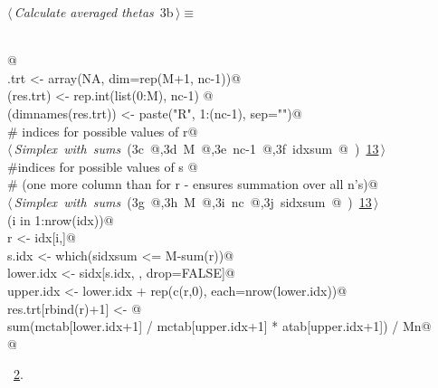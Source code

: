 \documentclass[reqno]{amsart}
\renewcommand{\NWtarget}[2]{\hypertarget{#1}{#2}}
\renewcommand{\NWlink}[2]{\hyperlink{#1}{#2}}
\begin{document}
\begin{flushleft} \small\label{scrap4}\raggedright\small
\NWtarget{nuweb3b}{} $\langle\,${\itshape Calculate averaged thetas}\nobreak\ {\footnotesize {3b}}$\,\rangle\equiv$
\vspace{-1ex}
\begin{list}{}{} \item
\mbox{}\verb@@\\
\mbox{}\verb@    @\\
\mbox{}\verb@res.trt <- array(NA, dim=rep(M+1, nc-1))@\\
\mbox{}\verb@dimnames(res.trt) <- rep.int(list(0:M), nc-1) @\\
\mbox{}\verb@names(dimnames(res.trt)) <- paste("R", 1:(nc-1), sep="")@\\
\mbox{}\verb@# indices for possible values of r@\\
\mbox{}\verb@@\hbox{$\langle\,${\itshape Simplex with sums}\nobreak\ ({\footnotesize 3c\label{scrap5}
 }\mbox{}\verb@idx @,{\footnotesize 3d\label{scrap6}
 }\mbox{}\verb@ M @,{\footnotesize 3e\label{scrap7}
 }\mbox{}\verb@ nc-1 @,{\footnotesize 3f\label{scrap8}
 }\mbox{}\verb@ idxsum @ ) {\footnotesize \NWlink{nuweb13}{13}}$\,\rangle$}\verb@@\\
\mbox{}\verb@#indices for possible values of s @\\
\mbox{}\verb@# (one more column than for r - ensures summation over all n's)@\\
\mbox{}\verb@@\hbox{$\langle\,${\itshape Simplex with sums}\nobreak\ ({\footnotesize 3g\label{scrap9}
 }\mbox{}\verb@sidx @,{\footnotesize 3h\label{scrap10}
 }\mbox{}\verb@ M @,{\footnotesize 3i\label{scrap11}
 }\mbox{}\verb@ nc @,{\footnotesize 3j\label{scrap12}
 }\mbox{}\verb@ sidxsum @ ) {\footnotesize \NWlink{nuweb13}{13}}$\,\rangle$}\verb@@\\
\mbox{}\verb@for (i in 1:nrow(idx)){@\\
\mbox{}\verb@  r <- idx[i,]@\\
\mbox{}\verb@  s.idx <- which(sidxsum <= M-sum(r))@\\
\mbox{}\verb@  lower.idx <- sidx[s.idx, , drop=FALSE]@\\
\mbox{}\verb@  upper.idx <- lower.idx + rep(c(r,0), each=nrow(lower.idx))@\\
\mbox{}\verb@  res.trt[rbind(r)+1] <- @\\
\mbox{}\verb@    sum(mctab[lower.idx+1] / mctab[upper.idx+1] * atab[upper.idx+1]) / Mn@\\
\mbox{}\verb@}@\\
\mbox{}\verb@@{\NWsep}
\end{list}
\vspace{-1.5ex}
\footnotesize
\begin{list}{}{\setlength{\itemsep}{-\parsep}\setlength{\itemindent}{-\leftmargin}}
\item \NWtxtMacroRefIn\ \NWlink{nuweb2}{2}.

\item{}
\end{list}
\vspace{4ex}
\end{flushleft}
\end{document}
